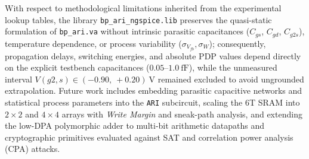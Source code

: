 With respect to methodological limitations inherited from the experimental lookup tables, the library \texttt{bp\_\allowbreak ari\_\allowbreak ngspice.lib} preserves the quasi-static formulation of \texttt{bp\_\allowbreak ari.va} without intrinsic parasitic capacitances ($C_{gs}$, $C_{gd}$, $C_{g2s}$), temperature dependence, or process variability ($\sigma_{V_{fb}}, \sigma_W$); consequently, propagation delays, switching energies, and absolute PDP values depend directly on the explicit testbench capacitances ($0.05\text{--}1.0\ \text{fF}$), while the unmeasured interval $V(g2,s) \in (-0.90,\allowbreak\ +0.20)\ \text{V}$ remained excluded to avoid ungrounded extrapolation. Future work includes embedding parasitic capacitive networks and statistical process parameters into the \texttt{ARI} subcircuit, scaling the 6T SRAM into $2 \times 2$ and $4 \times 4$ arrays with \textit{Write Margin} and sneak-path analysis, and extending the low-DPA polymorphic adder to multi-bit arithmetic datapaths and cryptographic primitives evaluated against SAT and correlation power analysis (CPA) attacks.
